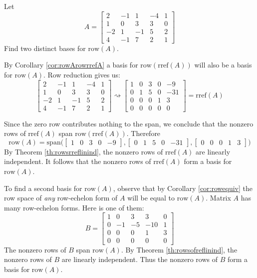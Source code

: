 \documentclass{ximera}
\begin{document}
\begin{example}\label{ex:basisrowspace}
Let
$$A=\begin{bmatrix}2&-1&1&-4&1\\1&0&3&3&0\\-2&1&-1&5&2\\4&-1&7&2&1\end{bmatrix}$$
Find two distinct bases for $\mbox{row}(A)$.
\begin{explanation}
By Corollary \ref{cor:rowArowrrefA} a basis for $\mbox{row}(\mbox{rref}(A))$ will also be a basis for $\mbox{row}(A)$. Row reduction gives us:
$$\begin{bmatrix}2&-1&1&-4&1\\1&0&3&3&0\\-2&1&-1&5&2\\4&-1&7&2&1\end{bmatrix}\rightsquigarrow\begin{bmatrix}1&0&3&0&-9\\0&1&5&0&-31\\0&0&0&1&3\\0&0&0&0&0\end{bmatrix}=\mbox{rref}(A)$$

Since the zero row contributes nothing to the span, we conclude that the nonzero rows of $\mbox{rref}(A)$ span $\mbox{row}(\mbox{rref}(A))$.  Therefore
$$\mbox{row}(A)=\mbox{span}\Big(\begin{bmatrix}1&0&3&0&-9\end{bmatrix},
\begin{bmatrix}0&1&5&0&-31\end{bmatrix},
\begin{bmatrix}0&0&0&1&3\end{bmatrix}\Big)$$
By Theorem \ref{th:rowsrreflinind}, the nonzero rows of $\mbox{rref}(A)$ are linearly independent.
It follows that the nonzero rows of $\mbox{rref}(A)$ form a basis for $\mbox{row}(A)$.

To find a second basis for $\mbox{row}(A)$, observe that by Corollary \ref{cor:rowequiv} the row space of {\it any} row-echelon form of $A$ will be equal to $\mbox{row}(A)$.  Matrix $A$ has many row-echelon forms.  Here is one of them:
$$B=\begin{bmatrix}1&0&3&3&0\\0&-1&-5&-10&1\\0&0&0&1&3\\0&0&0&0&0 \end{bmatrix}$$
The nonzero rows of $B$ span $\mbox{row}(A)$.  By Theorem \ref{th:rowsofreflinind}, the nonzero rows of $B$ are linearly independent.  Thus the nonzero rows of $B$ form a basis for $\mbox{row}(A)$.
\end{explanation}
\end{example}
\end{document}
